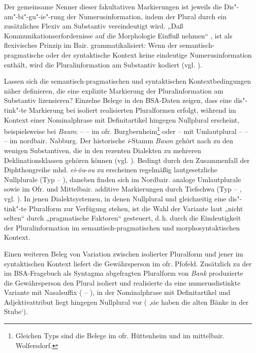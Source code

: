 Der gemeinsame Nenner dieser fakultativen Markierungen ist jeweils die Dis"-am"-bi"-gu"-ie"-rung der Numerusinformation, indem der Plural durch ein zusätzliches Flexiv am Substantiv vereindeutigt wird. „Daß Kommunikationserfordernisse auf die Morphologie Einfluß nehmen“ \citep[124]{Steininger1994}, ist als flexivisches Prinzip im Bair. grammatikalisiert: Wenn der semantisch-pragmatische oder der syntaktische Kontext keine eindeutige Numerusinformation enthält, wird die Pluralinformation am Substantiv kodiert (vgl. \citealt[171]{Rowley1997}).

Lassen sich die semantisch-pragmatischen und syntaktischen Kontextbedingungen näher definieren, die eine explizite Markierung der Pluralinformation am Substantiv lizensieren? Einzelne Belege in den BSA-Daten zeigen, dass eine dis"-tink"-te Markierung bei isoliert realisierten Pluralformen erfolgt, während im Kontext einer Nominalphrase mit Definitartikel hingegen Nullplural erscheint, beispielsweise bei \textit{Baum}:  --  --    im ofr. Burgbernheim\footnote{Gleichen Typs sind die Belege im ofr. Hüttenheim und im mittelbair. Wolfersdorf.} oder -- mit Umlautplural --  --  --    im nordbair. Nabburg. Der historische \textit{i}{}-Stamm \textit{Baum} gehört nach \citet[168]{Rowley1997} zu den wenigen Substantiven, die in den rezenten Dialekten zu mehreren Deklinationsklassen gehören können (vgl. \citealt[§797]{Schmeller1821}). Bedingt durch den Zusammenfall der Diphthongreihe mhd. \textit{ei}{}-\textit{öu}{}-\textit{ou} zu  erscheinen regelmäßig lautgesetzliche Nullplurale (Typ  -- ), daneben finden sich im Nordbair. analoge Umlautplurale sowie im Ofr. und Mittelbair. additive Markierungen durch Tiefschwa (Typ  -- , vgl. ). In jenen Dialektsystemen, in denen Nullplural und gleichzeitig eine dis"-tink"-te Pluralform zur Verfügung stehen, ist die Wahl der Variante laut \citet[168]{Rowley1997} „nicht selten“ durch „pragmatische Faktoren“ gesteuert, d.\,h. durch die Eindeutigkeit der Pluralinformation im semantisch-pragmatischen und morphosyntaktischen Kontext.

Einen weiteren Beleg von Variation zwischen isolierter Pluralform und jener im syntaktischen Kontext liefert die Gewährsperson im ofr. Pfofeld. Zusätzlich zu der im BSA-Fragebuch als Syntagma abgefragten Pluralform von \textit{Bank} produzierte die Gewährsperson den Plural isoliert und realisierte da eine numerusdistinkte Variante mit Nasalsuffix ( -- ), in der Nominalphrase mit Definitartikel und Adjektivattribut liegt hingegen Nullplural vor (       ‚sie haben die alten Bänke in der Stube‘).


